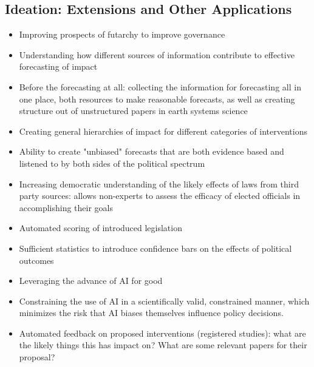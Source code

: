 \documentclass[12pt,a4paper]{article}
\begin{document}
\subsection{Ideation: Extensions and Other Applications}
\begin{itemize}
    \item Improving prospects of futarchy to improve governance
    \item Understanding how different sources of information contribute to effective forecasting of impact
    \item Before the forecasting at all: collecting the information for forecasting all in one place, both resources to make reasonable forecasts, as well as creating structure out of unstructured papers in earth systems science
    \item Creating general hierarchies of impact for different categories of interventions
    \item Ability to create "unbiased" forecasts that are both evidence based and listened to by both sides of the political spectrum
    \item Increasing democratic understanding of the likely effects of laws from third party sources: allows non-experts to assess the efficacy of elected officials in accomplishing their goals
    \item Automated scoring of introduced legislation 
    \item Sufficient statistics to introduce confidence bars on the effects of political outcomes
    \item Leveraging the advance of AI for good
    \item Constraining the use of AI in a scientifically valid, constrained manner, which minimizes the risk that AI biases themselves influence policy decisions.  
    \item Automated feedback on proposed interventions (registered studies): what are the likely things this has impact on? What are some relevant papers for their proposal?
\end{itemize}
\end{document}
